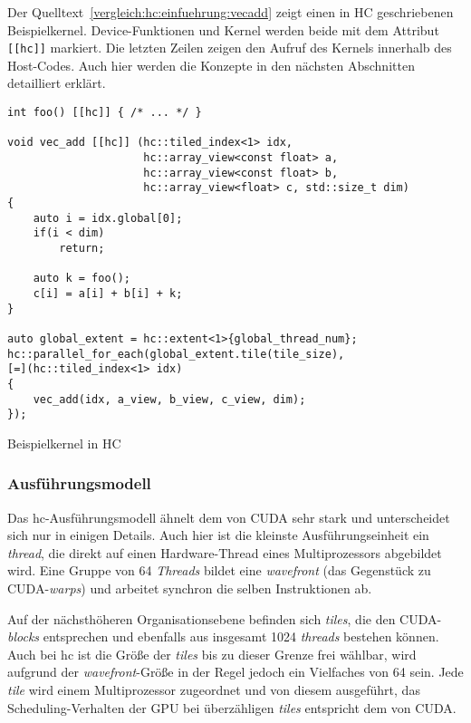Der Quelltext~\ref{vergleich:hc:einfuehrung:vecadd} zeigt einen in HC
geschriebenen Beispielkernel. Device-Funktionen und Kernel werden beide
mit dem Attribut \texttt{[[hc]]} markiert. Die letzten Zeilen zeigen den Aufruf
des Kernels innerhalb des Host-Codes. Auch hier werden die Konzepte in den
nächsten Abschnitten detailliert erklärt.

\begin{code}
    \begin{verbatim}
int foo() [[hc]] { /* ... */ }

void vec_add [[hc]] (hc::tiled_index<1> idx,
                     hc::array_view<const float> a,
                     hc::array_view<const float> b,
                     hc::array_view<float> c, std::size_t dim)
{
    auto i = idx.global[0];
    if(i < dim)
        return;

    auto k = foo();
    c[i] = a[i] + b[i] + k;
}

auto global_extent = hc::extent<1>{global_thread_num};
hc::parallel_for_each(global_extent.tile(tile_size),
[=](hc::tiled_index<1> idx)
{
    vec_add(idx, a_view, b_view, c_view, dim);
});
    \end{verbatim}
    \caption{Beispielkernel in HC}
    \label{vergleich:hc:einfuehrung:vecadd}
\end{code}

\subsubsection{Ausführungsmodell}

Das \gls{hc}-Ausführungsmodell ähnelt dem von CUDA sehr stark und unterscheidet
sich nur in einigen Details. Auch hier ist die kleinste Ausführungseinheit ein
\textit{thread}, die direkt auf einen Hardware-Thread eines Multiprozessors
abgebildet wird. Eine Gruppe von 64 \textit{Threads} bildet eine
\textit{wavefront} (das Gegenstück zu CUDA-\textit{warps}) und arbeitet synchron
die selben Instruktionen ab.

Auf der nächsthöheren Organisationsebene befinden sich \textit{tiles}, die
den CUDA-\textit{blocks} entsprechen und ebenfalls aus insgesamt \num{1024}
\textit{threads} bestehen können. Auch bei \gls{hc} ist die Größe der
\textit{tiles} bis zu dieser Grenze frei wählbar, wird aufgrund der
\textit{wavefront}-Größe in der Regel jedoch ein Vielfaches von 64 sein. Jede
\textit{tile} wird einem Multiprozessor zugeordnet und von diesem ausgeführt,
das Scheduling-Verhalten der GPU bei überzähligen \textit{tiles} entspricht
dem von CUDA.


